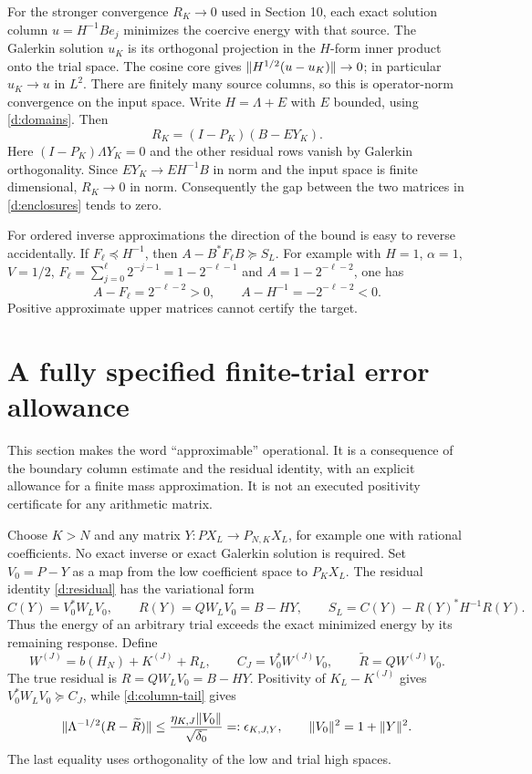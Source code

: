 For the stronger convergence $R_K\to0$ used in Section 10, each exact solution column $u=H^{-1}Be_j$ minimizes
the coercive energy with that source. The Galerkin solution $u_K$ is its
orthogonal projection in the $H$-form inner product onto the trial space.
The cosine core gives $\lVert H^{1/2}(u-u_K)\rVert\to0$; in particular
$u_K\to u$ in $L^2$. There are finitely many source columns, so this is
operator-norm convergence on the input space.
Write $H=\Lambda+E$ with $E$ bounded, using \eqref{d:domains}. Then
\[
R_K=(I-P_K)(B-EY_K).
\]
Here $(I-P_K)\Lambda Y_K=0$ and the other residual rows vanish by
Galerkin orthogonality. Since $EY_K\to EH^{-1}B$ in norm and the input
space is finite dimensional, $R_K\to0$ in norm. Consequently the gap
between the two matrices in \eqref{d:enclosures} tends to zero.

For ordered inverse approximations the direction of the bound is easy
to reverse accidentally. If $F_\ell\preceq H^{-1}$, then
$A-B^*F_\ell B\succeq S_L$.
For example with $H=1$, $\alpha=1$, $V=1/2$,
$F_\ell=\sum_{j=0}^\ell 2^{-j-1}=1-2^{-\ell-1}$ and
$A=1-2^{-\ell-2}$, one has
\[
A-F_\ell=2^{-\ell-2}>0,\qquad A-H^{-1}=-2^{-\ell-2}<0.
\]
Positive approximate upper matrices cannot certify the target.

\section{A fully specified finite-trial error allowance}
This section makes the word ``approximable'' operational. It is a
consequence of the boundary column estimate and the residual identity,
with an explicit allowance for a finite mass approximation. It is not
an executed positivity certificate for any arithmetic matrix.

Choose $K>N$ and any matrix $Y:PX_L\to P_{N,K}X_L$, for example one
with rational coefficients. No exact inverse or exact Galerkin solution
is required. Set $V_0=P-Y$ as a map from the low coefficient space to
$P_KX_L$. The residual identity \eqref{d:residual} has the variational form
\begin{equation}\label{d:variational}
C(Y)=V_0^*W_LV_0,\qquad R(Y)=QW_LV_0=B-HY,\qquad
S_L=C(Y)-R(Y)^*H^{-1}R(Y).
\end{equation}
Thus the energy of an arbitrary trial exceeds the exact minimized energy
by its remaining response. Define
\[
W^{(J)}=b(H_N)+K^{(J)}+R_L,\qquad
C_J=V_0^*W^{(J)}V_0,\qquad\widetilde R=QW^{(J)}V_0.
\]
The true residual is $R=QW_LV_0=B-HY$. Positivity of $K_L-K^{(J)}$
gives $V_0^*W_LV_0\succeq C_J$, while \eqref{d:column-tail} gives
\begin{equation}\label{d:residual-error}
\lVert \Lambda^{-1/2}(R-\widetilde R)\rVert
\le\frac{\eta_{K,J}\lVert V_0\rVert}{\sqrt{\delta_0}}
=:\epsilon_{K,J,Y},\qquad\lVert V_0\rVert^2=1+\lVert Y\rVert^2.
\end{equation}
The last equality uses orthogonality of the low and trial high spaces.


